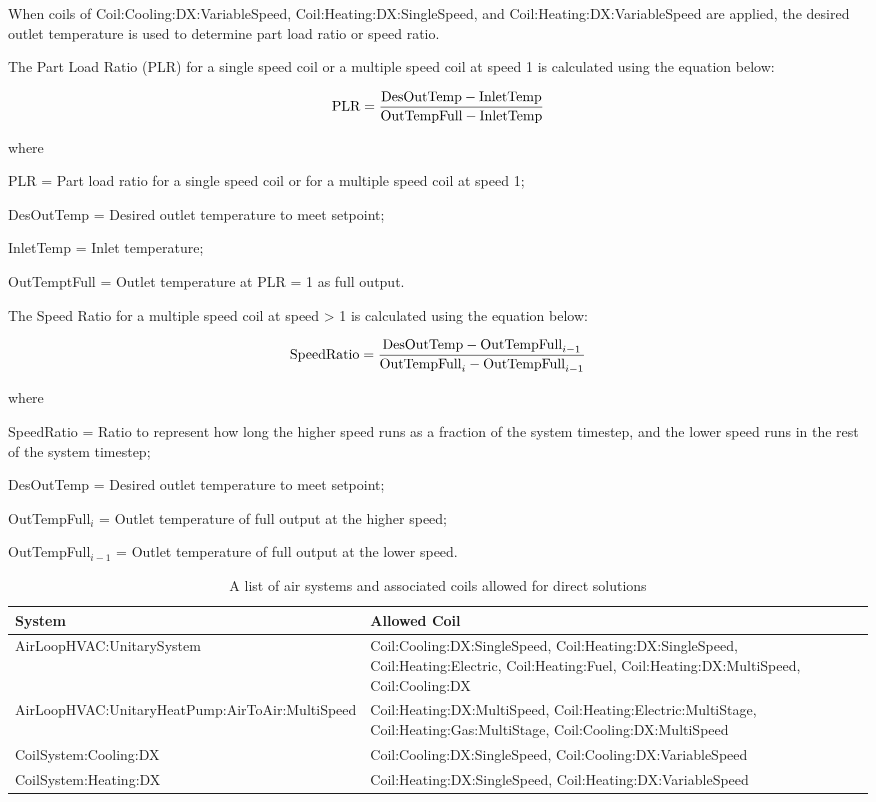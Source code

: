 When coils of Coil:Cooling:DX:VariableSpeed, Coil:Heating:DX:SingleSpeed, and Coil:Heating:DX:VariableSpeed are applied, the desired outlet temperature is used to determine part load ratio or speed ratio.

The Part Load Ratio (PLR) for a single speed coil or a multiple speed coil at speed 1 is calculated using the equation below:

\begin{equation}
    \textnormal{PLR} = \frac{\textnormal{DesOutTemp} - \textnormal{InletTemp}}{\textnormal{OutTempFull} - \textnormal{InletTemp}}
\end{equation}

where

PLR = Part load ratio for a single speed coil or for a multiple speed coil at speed 1;

DesOutTemp = Desired outlet temperature to meet setpoint;

InletTemp = Inlet temperature;

OutTemptFull = Outlet temperature at PLR = 1 as full output.

The Speed Ratio for a multiple speed coil at speed > 1 is calculated using the equation below:

\begin{equation}
    \textnormal{SpeedRatio} = \frac{\textnormal{DesOutTemp} - \textnormal{OutTempFull}_{i-1}}{\textnormal{OutTempFull}_{i} - \textnormal{OutTempFull}_{i-1}}
\end{equation}

where

SpeedRatio = Ratio to represent how long the higher speed runs as a fraction of the system timestep, and the lower speed runs in the rest of the system timestep;

DesOutTemp = Desired outlet temperature to meet setpoint;

OutTempFull$_{i}$ = Outlet temperature of full output at the higher speed;

OutTempFull$_{i-1}$ = Outlet temperature of full output at the lower speed.

\begin{longtable}[c]{p{4in}p{2.5in}}
    \caption{A list of air systems and associated coils allowed for direct solutions\label{table:a_list_of_air_systems_and_associated_coils_allowed_for_direct solutions}} \tabularnewline
    \toprule
    System & Allowed Coil \tabularnewline
    \midrule
    \endfirsthead

    AirLoopHVAC:UnitarySystem & Coil:Cooling:DX:SingleSpeed, Coil:Heating:DX:SingleSpeed, Coil:Heating:Electric, Coil:Heating:Fuel,  Coil:Heating:DX:MultiSpeed, Coil:Cooling:DX\tabularnewline
    AirLoopHVAC:UnitaryHeatPump:AirToAir:MultiSpeed & Coil:Heating:DX:MultiSpeed, Coil:Heating:Electric:MultiStage, Coil:Heating:Gas:MultiStage, Coil:Cooling:DX:MultiSpeed\tabularnewline
    CoilSystem:Cooling:DX & Coil:Cooling:DX:SingleSpeed, Coil:Cooling:DX:VariableSpeed \tabularnewline
    CoilSystem:Heating:DX & Coil:Heating:DX:SingleSpeed, Coil:Heating:DX:VariableSpeed \tabularnewline

    \bottomrule
\end{longtable}

